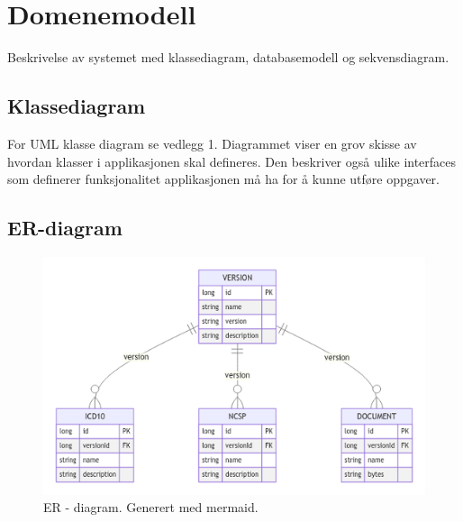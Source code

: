 \section{Domenemodell}

Beskrivelse av systemet med klassediagram, databasemodell og sekvensdiagram.

\subsection{Klassediagram}
For UML klasse diagram se vedlegg 1.
Diagrammet viser en grov skisse av hvordan klasser i applikasjonen skal defineres. Den beskriver også ulike interfaces som definerer funksjonalitet applikasjonen må ha for å kunne utføre oppgaver.

\subsection{ER-diagram}
\begin{figure}[ht]
    \centering
    \includegraphics{images/ER2.png}
    \caption{ER - diagram. Generert med mermaid.}
    \label{fig:my_label}
\end{figure}


\newpage
